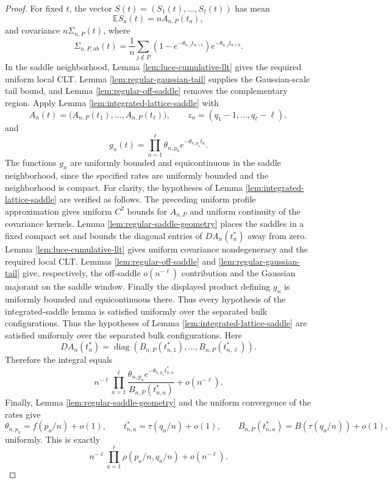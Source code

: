 \documentclass[11pt]{article}
\theoremstyle{remark}
\newcommand{\Ee}{\mathbb E}
\newcommand{\diag}{\operatorname{diag}}
\begin{document}
\begin{proof}
For fixed \(t\), the vector \(S(t)=(S_1(t),\ldots,S_\ell(t))\) has mean
\[
        \Ee S_a(t)=nA_{n,P}(t_a),
\]
and covariance \(n\Sigma_{n,P}(t)\), where
\[
        \Sigma_{n,P,ab}(t)=\frac1n\sum_{j\notin P}
        (1-e^{-\theta_{n,j}t_{a\wedge b}})e^{-\theta_{n,j}t_{a\vee b}}.
\]
In the saddle neighborhood, Lemma \ref{lem:luce-cumulative-llt} gives the required uniform local CLT.  Lemma \ref{lem:regular-gaussian-tail} supplies the Gaussian-scale tail bound, and Lemma \ref{lem:regular-off-saddle} removes the complementary region.  Apply Lemma \ref{lem:integrated-lattice-saddle} with
\[
        A_n(t)=\bigl(A_{n,P}(t_1),\ldots,A_{n,P}(t_\ell)\bigr),
        \qquad
        z_n=(q_1-1,\ldots,q_\ell-\ell),
\]
and
\[
        g_n(t)=\prod_{a=1}^\ell\theta_{n,p_a}e^{-\theta_{n,p_a}t_a}.
\]
The functions \(g_n\) are uniformly bounded and equicontinuous in the saddle neighborhood, since the specified rates are uniformly bounded and the neighborhood is compact.  
For clarity, the hypotheses of Lemma \ref{lem:integrated-lattice-saddle}
are verified as follows.  The preceding uniform profile approximation gives
uniform \(C^2\) bounds for \(A_{n,P}\) and uniform continuity of the covariance
kernels.  Lemma \ref{lem:regular-saddle-geometry} places the saddles in a fixed
compact set and bounds the diagonal entries of \(DA_n(t_n^*)\) away from zero.
Lemma \ref{lem:luce-cumulative-llt} gives uniform covariance
nondegeneracy and the required local CLT.  Lemmas
\ref{lem:regular-off-saddle} and \ref{lem:regular-gaussian-tail} give,
respectively, the off-saddle \(o(n^{-\ell})\) contribution and the Gaussian
majorant on the saddle window.  Finally the displayed product defining
\(g_n\) is uniformly bounded and equicontinuous there.  Thus every hypothesis
of the integrated-saddle lemma is satisfied uniformly over the separated bulk
configurations.
Thus the hypotheses of Lemma \ref{lem:integrated-lattice-saddle} are satisfied uniformly over the separated bulk configurations.  Here
\[
        DA_n(t_n^*)=
        \diag(B_{n,P}(t_{n,1}^*),\ldots,B_{n,P}(t_{n,\ell}^*)).
\]
Therefore the integral equals
\[
        n^{-\ell}\prod_{a=1}^\ell
        \frac{\theta_{n,p_a}e^{-\theta_{n,p_a}t_{n,a}^*}}{B_{n,P}(t_{n,a}^*)}
        +o(n^{-\ell}).
\]
Finally, Lemma \ref{lem:regular-saddle-geometry} and the uniform convergence of the rates give
\[
        \theta_{n,p_a}=f(p_a/n)+o(1),
        \qquad
        t_{n,a}^*=\tau(q_a/n)+o(1),
        \qquad
        B_{n,P}(t_{n,a}^*)=B(\tau(q_a/n))+o(1),
\]
uniformly.  This is exactly
\[
        n^{-\ell}\prod_{a=1}^\ell
        \rho(p_a/n,q_a/n)+o(n^{-\ell}).
\]
\end{proof}
\end{document}
